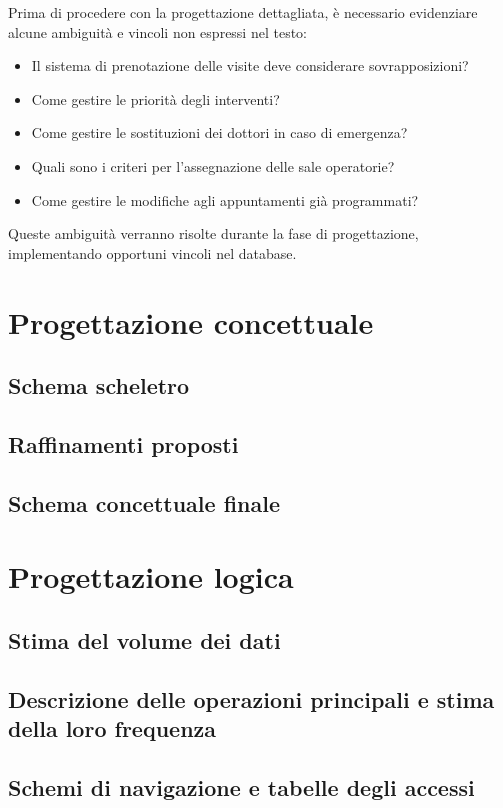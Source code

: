 \documentclass[12pt,a4paper]{report}
\begin{document}
Prima di procedere con la progettazione dettagliata, è necessario evidenziare alcune ambiguità e vincoli non espressi nel testo:

\begin{itemize}
\item Il sistema di prenotazione delle visite deve considerare sovrapposizioni?
\item Come gestire le priorità degli interventi?
\item Come gestire le sostituzioni dei dottori in caso di emergenza?
\item Quali sono i criteri per l'assegnazione delle sale operatorie?
\item Come gestire le modifiche agli appuntamenti già programmati?
\end{itemize}

Queste ambiguità verranno risolte durante la fase di progettazione, implementando opportuni vincoli nel database.

\chapter{Progettazione concettuale} 
\section{Schema scheletro}
\section{Raffinamenti proposti}
\section{Schema concettuale finale}

\chapter{Progettazione logica}
\section{Stima del volume dei dati}
\section{Descrizione delle operazioni principali e stima della loro frequenza}
\section{Schemi di navigazione e tabelle degli accessi}
\end{document}
